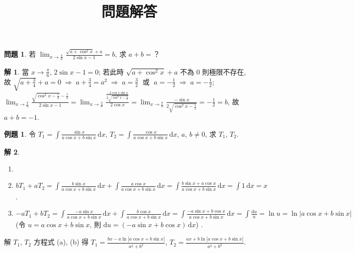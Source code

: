 \documentclass[12pt]{extarticle}
\newcommand{\ds}{\displaystyle}
\newcommand{\ie}{\;\Longrightarrow\;}
\theoremstyle{definition}
\newtheorem*{ex}{問題}
\newtheorem*{eg}{例題}
\newtheorem*{sol}{解}
\newcommand{\myline}{\noindent\makebox[\linewidth]{\rule{\paperwidth}{0.4pt}}}
\begin{document}
\title{\texorpdfstring{\vspace{-16mm} 問題解答}{問題解答}} 
\author{\vspace{-5em}}
\date{\vspace{-5em}}
\maketitle
\thispagestyle{firststyle}

\begin{ex}
  若 $\ds\lim_{x\to\frac{\pi}{6}}\frac{\sqrt{a + \cos^2 x} + a}{2\sin x - 1} = b$, 求 $a + b = $？
\end{ex}

\begin{sol}
  當 $\ds x \to \frac{\pi}{6}$, $2\sin x - 1 = 0$; 若此時 $\ds\sqrt{a + \cos^2 x} + a$ 不為 $0$ 則極限不存在, 故 $\ds\sqrt{a + \frac{3}{4}} + a = 0 \ie a  + \frac{3}{4} = a^2 \ie a = \frac{3}{2}\;\text{ 或 }\;a = -\frac{1}{2} \ie a = -\frac{1}{2}$; $\ds\lim_{x\to\frac{\pi}{6}}\frac{\sqrt{\cos^2 x - \frac{1}{2}} - \frac{1}{2}}{2\sin x - 1} = \lim_{x\to\frac{\pi}{6}}\frac{\frac{-2\cos x\sin x}{2\sqrt{\cos^2 x - \frac{1}{2}}}}{2\cos x} = \lim_{x\to\frac{\pi}{6}}\frac{-\sin x}{2\sqrt{\cos^2 x - \frac{1}{2}}} = -\frac{1}{2} = b$, 故 $a + b = -1$.  
\end{sol}

\myline

\begin{eg}
  令 $\ds T_1 = \int\!\frac{\sin x}{a\cos x + b\sin x}\,\text{d}x$, $\ds T_2 = \int\!\frac{\cos x}{a\cos x + b\sin x}\,\text{d}x$, $a$, $b\ne 0$, 求 $T_1$, $T_2$. 
\end{eg}

\begin{sol}
  \begin{enumerate}[label=(\alph*)]\setlength{\itemsep}{0pt}
    \item[]
    \item $\ds b T_1 + a T_2 = \int\!\frac{b\sin x}{a\cos x + b\sin x}\,\text{d}x + \int\!\frac{a\cos x}{a\cos x + b\sin x}\,\text{d}x = \int\!\frac{b\sin x + a\cos x}{a\cos x + b\sin x}\,\text{d}x = \int 1\,\text{d}x = x$. 
    \item $\ds -a T_1 + b T_2 = \int\!\frac{-a\sin x}{a\cos x + b\sin x}\,\text{d}x + \int\!\frac{b\cos x}{a\cos x + b\sin x}\,\text{d}x = \int\!\frac{-a\sin x + b\cos x}{a\cos x + b\sin x}\,\text{d}x = \int\!\frac{\text{d}u}{u} = \ln u = \ln|a\cos x + b\sin x|$ (令 $\ds u = a\cos x + b\sin x$, 則 $\ds\text{d}u = (-a\sin x + b\cos x)\,\text{d}x$) . 
  \end{enumerate}
  解 $T_1$, $T_2$ 方程式 (a), (b) 得 $\ds T_1 = \frac{bx - a\ln|a\cos x + b\sin x|}{a^2 + b^2}$, $\ds T_2 = \frac{ax + b\ln|a\cos x + b\sin x|}{a^2 + b^2}$. 
\end{sol}
\end{document}

